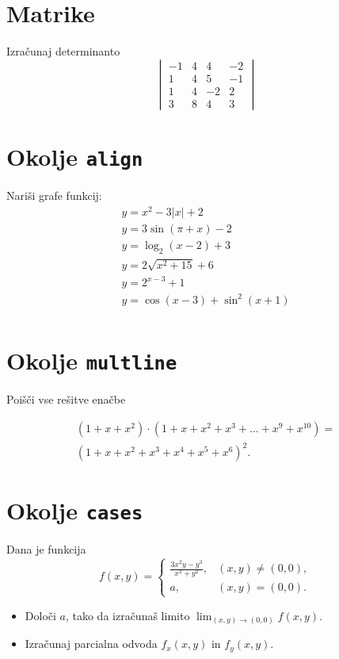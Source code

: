\documentclass[a4paper,12pt]{article}
\begin{document}
\section*{Matrike}
Izračunaj determinanto
\[ \begin{vmatrix}
    -1 & 4 & 4 & -2 \\
    1 & 4 & 5 & -1 \\
    1 & 4 & -2 & 2 \\
    3 & 8 & 4 & 3 
\end{vmatrix} \]
\section*{Okolje \texttt{align}}
Nariši grafe funkcij:
\[
\begin{aligned}
y = x^2 - 3|x| + 2  \\ y = 3 \sin(\pi+x) - 2 \\
y = \log_2(x-2) + 3 \\ y = 2 \sqrt{x^2+15} + 6 \\
y = 2^{x-3} + 1 \\     y = \cos(x-3) + \sin^2(x+1) \\
\end{aligned}
\]

\section*{Okolje \texttt{multline}}
Poišči vse rešitve enačbe

\begin{multline*}
(1+x+x^2) \cdot (1+x+x^2+x^3+\ldots+x^9+x^{10}) = \\ 
(1+x+x^2+x^3+x^4+x^5+x^6)^2.
\end{multline*}


\section*{Okolje \texttt{cases}}
Dana je funkcija
\[f(x,y)=
\begin{cases}
\frac{3x^2y-y^3}{x^2+y^2}, & (x,y)\ne(0,0),\\
a, & (x,y)=(0,0).
\end{cases}\]
   
\begin{itemize}
\item Določi \(a\), tako da izračunaš limito \( \lim_{(x,y)\to(0,0)} f(x,y) \).
\item Izračunaj parcialna odvoda \(f_x(x,y)\) in \(f_y(x,y)\).
\end{itemize}
\end{document}
